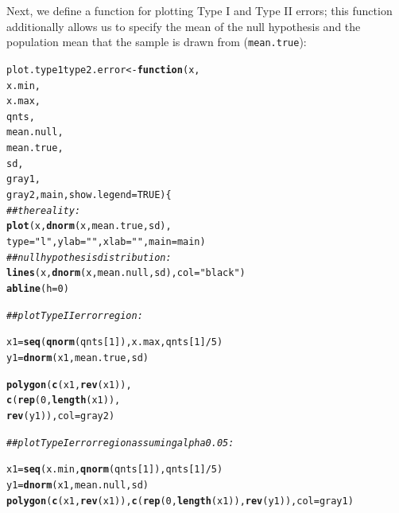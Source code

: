 \documentclass[12pt]{book}\usepackage[]{graphicx}\usepackage[]{color}
\makeatletter
\newcommand{\hlnum}[1]{\textcolor[rgb]{0.686,0.059,0.569}{#1}}%
\newcommand{\hlstr}[1]{\textcolor[rgb]{0.192,0.494,0.8}{#1}}%
\newcommand{\hlcom}[1]{\textcolor[rgb]{0.678,0.584,0.686}{\textit{#1}}}%
\newcommand{\hlopt}[1]{\textcolor[rgb]{0,0,0}{#1}}%
\newcommand{\hlstd}[1]{\textcolor[rgb]{0.345,0.345,0.345}{#1}}%
\newcommand{\hlkwa}[1]{\textcolor[rgb]{0.161,0.373,0.58}{\textbf{#1}}}%
\newcommand{\hlkwb}[1]{\textcolor[rgb]{0.69,0.353,0.396}{#1}}%
\newcommand{\hlkwc}[1]{\textcolor[rgb]{0.333,0.667,0.333}{#1}}%
\newcommand{\hlkwd}[1]{\textcolor[rgb]{0.737,0.353,0.396}{\textbf{#1}}}%
\newenvironment{kframe}{%
 \def\at@end@of@kframe{}%
 \ifinner\ifhmode%
  \def\at@end@of@kframe{\end{minipage}}%
  \begin{minipage}{\columnwidth}%
 \fi\fi%
 \def\FrameCommand##1{\hskip\@totalleftmargin \hskip-\fboxsep
 \colorbox{shadecolor}{##1}\hskip-\fboxsep
     \hskip-\linewidth \hskip-\@totalleftmargin \hskip\columnwidth}%
 \MakeFramed {\advance\hsize-\width
   \@totalleftmargin\z@ \linewidth\hsize
   \@setminipage}}%
 {\par\unskip\endMakeFramed%
 \at@end@of@kframe}
\newenvironment{knitrout}{}{} %
\makeatother
\begin{document}
Next, we define a function for plotting Type I and Type II errors;
this function additionally allows us to specify the mean of the null
hypothesis and the population mean that the sample is drawn from
(\texttt{mean.true}):

\begin{knitrout}
\color{fgcolor}\begin{kframe}
\begin{alltt}
\hlstd{plot.type1type2.error}\hlkwb{<-}\hlkwa{function}\hlstd{(}\hlkwc{x}\hlstd{,}
                           \hlkwc{x.min}\hlstd{,}
                           \hlkwc{x.max}\hlstd{,}
                           \hlkwc{qnts}\hlstd{,}
                           \hlkwc{mean.null}\hlstd{,}
                           \hlkwc{mean.true}\hlstd{,}
                           \hlkwc{sd}\hlstd{,}
                           \hlkwc{gray1}\hlstd{,}
                           \hlkwc{gray2}\hlstd{,}\hlkwc{main}\hlstd{,}\hlkwc{show.legend}\hlstd{=}\hlnum{TRUE}\hlstd{)\{}
        \hlcom{## the reality:}
        \hlkwd{plot}\hlstd{(x,} \hlkwd{dnorm}\hlstd{(x,mean.true,sd),}
             \hlkwc{type} \hlstd{=} \hlstr{"l"}\hlstd{,}\hlkwc{ylab}\hlstd{=}\hlstr{""}\hlstd{,}\hlkwc{xlab}\hlstd{=}\hlstr{""}\hlstd{,}\hlkwc{main}\hlstd{=main)}
        \hlcom{## null hypothesis distribution:}
      \hlkwd{lines}\hlstd{(x,}\hlkwd{dnorm}\hlstd{(x,mean.null,sd),}\hlkwc{col}\hlstd{=}\hlstr{"black"}\hlstd{)}
      \hlkwd{abline}\hlstd{(}\hlkwc{h} \hlstd{=} \hlnum{0}\hlstd{)}

    \hlcom{## plot Type II error region: }

        \hlstd{x1} \hlkwb{=} \hlkwd{seq}\hlstd{(}\hlkwd{qnorm}\hlstd{(qnts[}\hlnum{1}\hlstd{]), x.max, qnts[}\hlnum{1}\hlstd{]}\hlopt{/}\hlnum{5}\hlstd{)}
        \hlstd{y1} \hlkwb{=} \hlkwd{dnorm}\hlstd{(x1, mean.true, sd)}

      \hlkwd{polygon}\hlstd{(}\hlkwd{c}\hlstd{(x1,} \hlkwd{rev}\hlstd{(x1)),}
              \hlkwd{c}\hlstd{(}\hlkwd{rep}\hlstd{(}\hlnum{0}\hlstd{,} \hlkwd{length}\hlstd{(x1)),}
              \hlkwd{rev}\hlstd{(y1)),} \hlkwc{col} \hlstd{= gray2)}

    \hlcom{## plot Type I error region assuming alpha 0.05:}

    \hlstd{x1} \hlkwb{=} \hlkwd{seq}\hlstd{(x.min,} \hlkwd{qnorm}\hlstd{(qnts[}\hlnum{1}\hlstd{]), qnts[}\hlnum{1}\hlstd{]}\hlopt{/}\hlnum{5}\hlstd{)}
    \hlstd{y1} \hlkwb{=} \hlkwd{dnorm}\hlstd{(x1, mean.null, sd)}
    \hlkwd{polygon}\hlstd{(}\hlkwd{c}\hlstd{(x1,} \hlkwd{rev}\hlstd{(x1)),} \hlkwd{c}\hlstd{(}\hlkwd{rep}\hlstd{(}\hlnum{0}\hlstd{,} \hlkwd{length}\hlstd{(x1)),} \hlkwd{rev}\hlstd{(y1)),} \hlkwc{col} \hlstd{= gray1)}


\end{alltt}
\end{kframe}
\end{knitrout}
\end{document}
